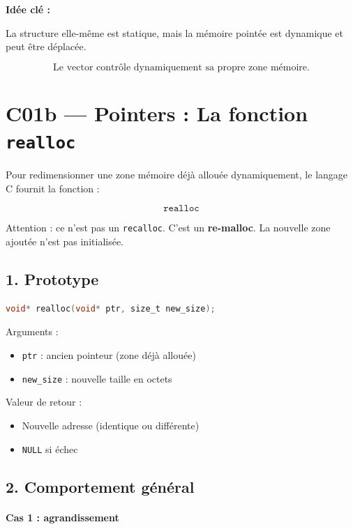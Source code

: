 \bigskip
\textbf{Idée clé :}

La structure elle-même est statique,
mais la mémoire pointée est dynamique et peut être déplacée.

\[
\boxed{\text{Le vector contrôle dynamiquement sa propre zone mémoire.}}
\]

\section{C01b — Pointers : La fonction \texttt{realloc}}

Pour redimensionner une zone mémoire déjà allouée dynamiquement,
le langage C fournit la fonction :

\[
\boxed{\texttt{realloc}}
\]

Attention : ce n’est pas un \texttt{recalloc}.
C’est un \textbf{re-malloc}.  
La nouvelle zone ajoutée n’est pas initialisée.

\subsection*{1. Prototype}

\begin{lstlisting}[language=C]
void* realloc(void* ptr, size_t new_size);
\end{lstlisting}

Arguments :

\begin{itemize}
    \item \texttt{ptr} : ancien pointeur (zone déjà allouée)
    \item \texttt{new\_size} : nouvelle taille en octets
\end{itemize}

Valeur de retour :

\begin{itemize}
    \item Nouvelle adresse (identique ou différente)
    \item \texttt{NULL} si échec
\end{itemize}

\subsection*{2. Comportement général}

\paragraph{Cas 1 : agrandissement}

